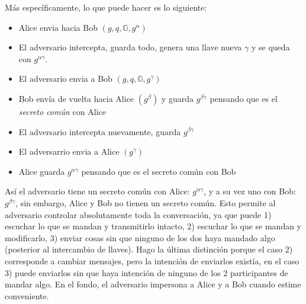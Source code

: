 \documentclass[twoside]{tareas}
\begin{document}
Más específicamente, lo que puede hacer es lo siguiente:

\begin{itemize}
    \item Alice envia hacia Bob $(g, q, \mathbb{G}, g^\alpha)$
    \item El adversario intercepta, guarda todo, genera una llave nueva $\gamma$ y se queda con $g^{\alpha\gamma}$.
    \item El adversario envia a Bob $(g, q, \mathbb{G}, g^\gamma)$
    \item Bob envía de vuelta hacia Alice $(g^\beta)$ y guarda $g^{\beta\gamma}$ pensando que es el \textit{secreto común} con Alice
    \item El adversario intercepta nuevamente, guarda $g^{\beta\gamma}$
    \item El adversarrio envia a Alice $(g^\gamma)$
    \item Alice guarda $g^{\alpha\gamma}$ pensando que es el secreto común con Bob
\end{itemize}

Así el adversario tiene un secreto común con Alice: $g^{\alpha\gamma}$, y a su vez uno con Bob: $g^{\beta\gamma}$, sin embargo, Alice y Bob no tienen un secreto común. Esto permite al adversario controlar absolutamente toda la conversación, ya que puede 1) escuchar lo que se mandan y transmitirlo intacto, 2) escuchar lo que se mandan y modificarlo, 3) enviar cosas sin que ninguno de los dos haya mandado algo (posterior al intercambio de llaves). Hago la última distinción porque el caso 2) corresponde a cambiar mensajes, pero la intención de enviarlos existía, en el caso 3) puede enviarlos sin que haya intención de ninguno de los 2 participantes de mandar algo. En el fondo, el adversario impersona a Alice y a Bob cuando estime conveniente.
\end{document}
